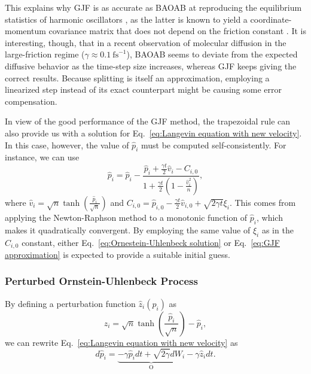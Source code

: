 \documentclass[
aip,
jcp,
reprint,
]{revtex4-1}
\newcommand{\nn}{n}
\begin{document}
This explains why GJF is as accurate as BAOAB at reproducing the equilibrium statistics of harmonic oscillators \cite{Jensen_2019, Farago_2019, Finkelstein_2019}, as the latter is known to yield a coordinate-momentum covariance matrix that does not depend on the friction constant \cite{Leimkuhler_2013_2}.
It is interesting, though, that in a recent observation of molecular diffusion in the large-friction regime ($\gamma \approx  0.1~\mathrm{fs}^{-1}$), BAOAB seems to deviate from the expected diffusive behavior as the time-step size increases, whereas GJF keeps giving the correct results.
Because splitting is itself an approximation, employing a linearized step instead of its exact counterpart might be causing some error compensation.

In view of the good performance of the GJF method, the trapezoidal rule can also provide us with a solution for Eq.~\eqref{eq:Langevin equation with new velocity}.
In this case, however, the value of $\hat{p}_i$ must be computed self-consistently.
For instance, we can use
\begin{equation}
\hat{p}_i = \hat{p}_i - \frac{\hat{p}_i + \frac{\gamma t}{2} \hat{v}_i - C_{i,0}}{1 + \frac{\gamma t}{2} \left(1 - \frac{\hat{v}_i^2}{\nn} \right)},
\end{equation}
where $\hat{v}_i = \sqrt{\nn} \tanh\left(\frac{\hat{p}_i}{\sqrt{\nn}}\right)$ and $C_{i,0} = \hat{p}_{i,0} - \frac{\gamma t}{2} \hat{v}_{i,0} + \sqrt{2 \gamma t} \xi_i$.
This comes from applying the Newton-Raphson method to a monotonic function of $\hat{p}_i$, which makes it quadratically convergent.
By employing the same value of $\xi_i$ as in the $C_{i,0}$ constant, either Eq.~\eqref{eq:Ornestein-Uhlenbeck solution} or Eq.~\eqref{eq:GJF approximation} is expected to provide a suitable initial guess.

\subsubsection{Perturbed Ornstein-Uhlenbeck Process}

By defining a perturbation function $\hat{z}_i(\hat{p}_i)$ as
\begin{equation}
z_i = \sqrt{\nn} \tanh\left(\frac{\hat{p}_i}{\sqrt{\nn}}\right) - \hat{p}_i,
\end{equation}
we can rewrite Eq.~\eqref{eq:Langevin equation with new velocity} as
\begin{equation}
\label{eq:Langevin equation with perturbed OU process}
d\hat{p}_i = \underbrace{- \gamma \hat{p}_i dt + \sqrt{2 \gamma} dW_i}_\mathrm{O} - \gamma \hat{z}_i dt.
\end{equation}
\end{document}
